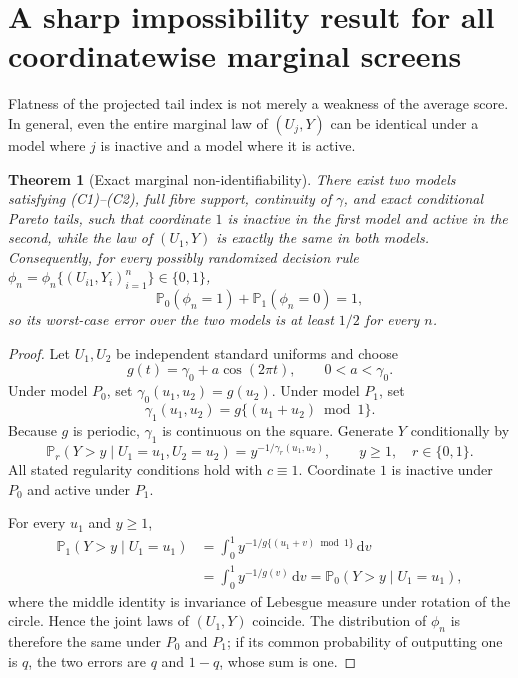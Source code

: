 \documentclass[11pt]{article}
\newtheorem{theorem}{Theorem}[section]
\theoremstyle{definition}\newtheorem{definition}[theorem]{Definition}
\newcommand{\Pp}{\mathbb P}
\begin{document}
\section{A sharp impossibility result for all coordinatewise marginal screens}

Flatness of the projected tail index is not merely a weakness of the average
score.  In general, even the entire marginal law of $(U_j,Y)$ can be
identical under a model where $j$ is inactive and a model where it is active.

\begin{theorem}[Exact marginal non-identifiability]
\label{thm:marginal-impossibility}
There exist two models satisfying (C1)--(C2), full fibre support, continuity of
$\gamma$, and exact conditional Pareto tails, such that coordinate $1$ is
inactive in the first model and active in the second, while the law of
$(U_1,Y)$ is exactly the same in both models.  Consequently, for every
possibly randomized decision rule
$\phi_n=\phi_n\{(U_{i1},Y_i)_{i=1}^n\}\in\{0,1\}$,
\begin{equation}
 \Pp_0(\phi_n=1)+\Pp_1(\phi_n=0)=1,
 \label{eq:impossibility-risk}
\end{equation}
so its worst-case error over the two models is at least $1/2$ for every $n$.
\end{theorem}

\begin{proof}
Let $U_1,U_2$ be independent standard uniforms and choose
\[
 g(t)=\gamma_0+a\cos(2\pi t),
 \qquad 0<a<\gamma_0.
\]
Under model $P_0$, set $\gamma_0(u_1,u_2)=g(u_2)$.  Under model $P_1$, set
\[
 \gamma_1(u_1,u_2)=g\{(u_1+u_2)\bmod1\}.
\]
Because $g$ is periodic, $\gamma_1$ is continuous on the square.  Generate
$Y$ conditionally by
\[
 \Pp_r(Y>y\mid U_1=u_1,U_2=u_2)
 =y^{-1/\gamma_r(u_1,u_2)},
 \qquad y\ge1,
 \quad r\in\{0,1\}.
\]
All stated regularity conditions hold with $c\equiv1$.  Coordinate $1$ is
inactive under $P_0$ and active under $P_1$.

For every $u_1$ and $y\ge1$,
\begin{align*}
 \Pp_1(Y>y\mid U_1=u_1)
 &=\int_0^1y^{-1/g\{(u_1+v)\bmod1\}}\,\mathrm dv\\
 &=\int_0^1y^{-1/g(v)}\,\mathrm dv
 =\Pp_0(Y>y\mid U_1=u_1),
\end{align*}
where the middle identity is invariance of Lebesgue measure under rotation of
the circle.  Hence the joint laws of $(U_1,Y)$ coincide.  The distribution of
$\phi_n$ is therefore the same under $P_0$ and $P_1$; if its common
probability of outputting one is $q$, the two errors are $q$ and $1-q$, whose
sum is one.
\end{proof}
\end{document}
